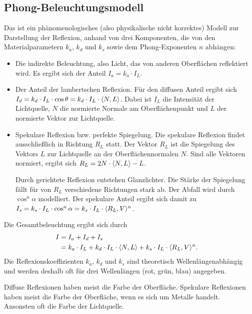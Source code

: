 \subsection{Phong-Beleuchtungsmodell}
Das  ist ein phänomenologisches (also physikalische nicht korrektes) Modell zur Darstellung der Reflexion, anhand von drei Komponenten, die von den Materialparametern $k_a$, $k_d$ und $k_s$ sowie dem Phong-Exponenten $n$ abhängen:
\begin{itemize}
	\item {}
	Die indirekte Beleuchtung, also Licht, das von anderen Oberflächen reflektiert wird.
	Es ergibt sich der Anteil $I_a = k_a \cdot I_L$.
	\item {}
	Der Anteil der lambertschen Reflexion.
	Für den diffusen Anteil ergibt sich $I_d = k_d \cdot I_L \cdot \cos \theta = k_d \cdot I_L \cdot \langle N, L \rangle$.
	Dabei ist $I_L$ die Intensität der Lichtquelle, $N$ die normierte Normale am Oberflächenpunkt und $L$ der normierte Vektor zur Lichtquelle.
	\item {}
	Spekulare Reflexion bzw. perfekte Spiegelung.
	Die spekulare Reflexion findet ausschließlich in Richtung $R_L$ statt.
	Der Vektor $R_L$ ist die Spiegelung des Vektors $L$ zur Lichtquelle an der Oberflächennormalen $N$.
	Sind alle Vektoren normiert, ergibt sich $R_L = 2N \cdot \langle N, L \rangle - L$.

	Durch gerichtete Reflexion entstehen Glanzlichter.
	Die Stärke der Spiegelung fällt für von $R_L$ verschiedene Richtungen stark ab.
	Der Abfall wird durch $\cos^n \alpha$ modelliert.
	Der spekulare Anteil ergibt sich damit zu $I_s = k_s \cdot I_L \cdot \cos^n \alpha = k_s \cdot I_L \cdot \langle R_L, V \rangle^n$.
\end{itemize}
Die Gesamtbeleuchtung ergibt sich durch
\begin{align*}
	I &= I_a + I_d + I_s \\
	  &= k_a \cdot I_L +
	  	 k_d \cdot I_L \cdot \langle N, L \rangle +
	  	 k_s \cdot I_L \cdot \langle R_L, V \rangle^n \text{.}
	\end{align*}
Die Reflexionskoeffizienten $k_a$, $k_d$ und $k_s$ sind theoretisch Wellenlängenabhängig und werden deshalb oft für drei Wellenlängen (rot, grün, blau) angegeben.

Diffuse Reflexionen haben meist die Farbe der Oberfläche.
Spekulare Reflexionen haben meist die Farbe der Oberfläche, wenn es sich um Metalle handelt.
Ansonsten oft die Farbe der Lichtquelle.

